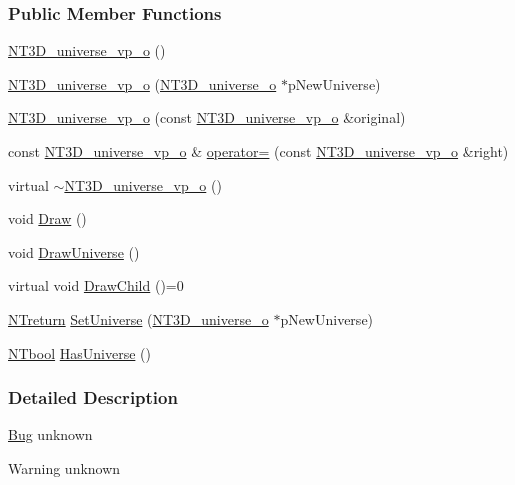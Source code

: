 \subsubsection*{Public Member Functions}
\begin{DoxyCompactItemize}
\item 
\hyperlink{class_n_t3_d__universe__vp__o_a0a39d9eb73310c7d1e27659c7a0a9c0b}{NT3D\_\-universe\_\-vp\_\-o} ()
\item 
\hyperlink{class_n_t3_d__universe__vp__o_aa1093a3a3df2cd2a8f6a05821c81b547}{NT3D\_\-universe\_\-vp\_\-o} (\hyperlink{class_n_t3_d__universe__o}{NT3D\_\-universe\_\-o} $\ast$pNewUniverse)
\item 
\hyperlink{class_n_t3_d__universe__vp__o_a09578b0e2859d69036413082418baa5a}{NT3D\_\-universe\_\-vp\_\-o} (const \hyperlink{class_n_t3_d__universe__vp__o}{NT3D\_\-universe\_\-vp\_\-o} \&original)
\item 
const \hyperlink{class_n_t3_d__universe__vp__o}{NT3D\_\-universe\_\-vp\_\-o} \& \hyperlink{class_n_t3_d__universe__vp__o_a43f20fc7480ead624b174f3bb8996da4}{operator=} (const \hyperlink{class_n_t3_d__universe__vp__o}{NT3D\_\-universe\_\-vp\_\-o} \&right)
\item 
virtual \hyperlink{class_n_t3_d__universe__vp__o_a0dbccdae55c91eb2352bea298fe58b57}{$\sim$NT3D\_\-universe\_\-vp\_\-o} ()
\item 
void \hyperlink{class_n_t3_d__universe__vp__o_a0ae04e4074fa409fd1fbabe40971a50c}{Draw} ()
\item 
void \hyperlink{class_n_t3_d__universe__vp__o_ad5c038198e15eaabcffb92182ceaf03e}{DrawUniverse} ()
\item 
virtual void \hyperlink{class_n_t3_d__universe__vp__o_a222b5b945db277591983d9279ef24acf}{DrawChild} ()=0
\item 
\hyperlink{nt__types_8h_ab9564ee8f091e809d21b8451c6683c53}{NTreturn} \hyperlink{class_n_t3_d__universe__vp__o_afd05f75b91aeac8676450fabda30a676}{SetUniverse} (\hyperlink{class_n_t3_d__universe__o}{NT3D\_\-universe\_\-o} $\ast$pNewUniverse)
\item 
\hyperlink{nt__types_8h_a9f3200824a52174bb5be77bed3838822}{NTbool} \hyperlink{class_n_t3_d__universe__vp__o_afa3e658a1cf6f45296e066fdc5e0d566}{HasUniverse} ()
\end{DoxyCompactItemize}


\subsubsection{Detailed Description}
\begin{Desc}
\item[\hyperlink{bug__bug000049}{Bug}]unknown \end{Desc}
\begin{DoxyWarning}{Warning}
unknown 
\end{DoxyWarning}


